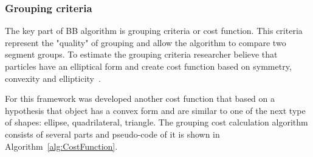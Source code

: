 \documentclass{lutmscthesis}[2010/09/22]
\begin{document}
\begin{figure}[htp]
\end{figure}

\subsubsection{Grouping criteria}

The key part of BB algorithm is grouping criteria or cost function. This criteria represent the "quality" of grouping and allow the algorithm to compare two segment groups. To estimate the grouping criteria researcher believe that particles have an elliptical form and create cost function based on symmetry, convexity and ellipticity~\cite{zafari-bb}.

For this framework was developed another cost function that based on a hypothesis that object has a convex form and are similar to one of the next type of shapes: ellipse, quadrilateral, triangle. The grouping cost calculation algorithm consists of several parts and pseudo-code of it is shown in Algorithm~\ref{alg:CostFunction}.
\end{document}
